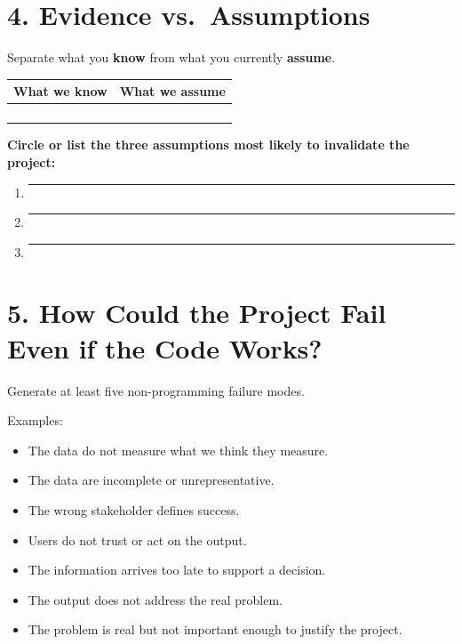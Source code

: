 \documentclass[11pt]{article}
\begin{document}
\section*{4. Evidence vs.\ Assumptions}

Separate what you \textbf{know} from what you currently \textbf{assume}.

\begin{center}
\begin{tabularx}{\textwidth}{X X}
\toprule
\textbf{What we know} & \textbf{What we assume} \\
\midrule
 & \\[0.55in]
 & \\[0.55in]
 & \\[0.55in]
 & \\[0.55in]
\bottomrule
\end{tabularx}
\end{center}

\textbf{Circle or list the three assumptions most likely to invalidate the project:}

\begin{enumerate}[leftmargin=*]
    \item \rule{0.88\textwidth}{0.4pt}
    \item \rule{0.88\textwidth}{0.4pt}
    \item \rule{0.88\textwidth}{0.4pt}
\end{enumerate}

\section*{5. How Could the Project Fail Even if the Code Works?}

Generate at least five non-programming failure modes.

Examples:
\begin{itemize}[leftmargin=*]
    \item The data do not measure what we think they measure.
    \item The data are incomplete or unrepresentative.
    \item The wrong stakeholder defines success.
    \item Users do not trust or act on the output.
    \item The information arrives too late to support a decision.
    \item The output does not address the real problem.
    \item The problem is real but not important enough to justify the project.
\end{itemize}
\end{document}
